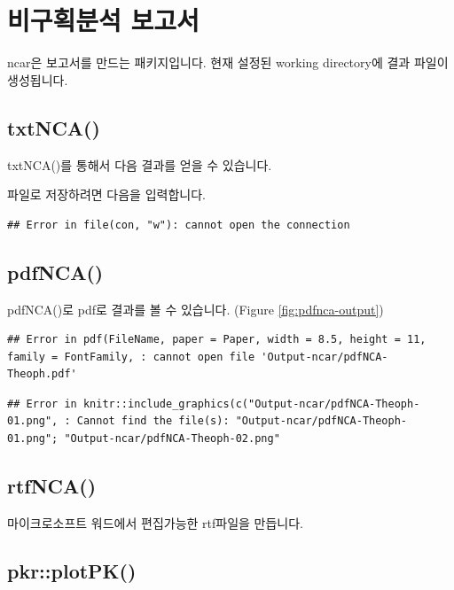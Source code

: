 \documentclass[
  11pt,
  krantz2, a4paper, twoside]{krantz}
\begin{document}
\hypertarget{uxbe44uxad6cuxd68duxbd84uxc11d-uxbcf4uxace0uxc11c}{%
\section{비구획분석 보고서}\label{uxbe44uxad6cuxd68duxbd84uxc11d-uxbcf4uxace0uxc11c}}

ncar은 보고서를 만드는 패키지입니다. 현재 설정된 working directory에 결과 파일이 생성됩니다.

\hypertarget{txtnca}{%
\subsection{txtNCA()}\label{txtnca}}

txtNCA()를 통해서 다음 결과를 얻을 수 있습니다.

파일로 저장하려면 다음을 입력합니다.

\begin{verbatim}
## Error in file(con, "w"): cannot open the connection
\end{verbatim}

\hypertarget{pdfnca}{%
\subsection{pdfNCA()}\label{pdfnca}}

pdfNCA()로 pdf로 결과를 볼 수 있습니다. (Figure \ref{fig:pdfnca-output})

\begin{verbatim}
## Error in pdf(FileName, paper = Paper, width = 8.5, height = 11, family = FontFamily, : cannot open file 'Output-ncar/pdfNCA-Theoph.pdf'
\end{verbatim}

\begin{verbatim}
## Error in knitr::include_graphics(c("Output-ncar/pdfNCA-Theoph-01.png", : Cannot find the file(s): "Output-ncar/pdfNCA-Theoph-01.png"; "Output-ncar/pdfNCA-Theoph-02.png"
\end{verbatim}

\hypertarget{rtfnca}{%
\subsection{rtfNCA()}\label{rtfnca}}

마이크로소프트 워드에서 편집가능한 rtf파일을 만듭니다.

\hypertarget{pkrplotpk}{%
\subsection{pkr::plotPK()}\label{pkrplotpk}}
\end{document}
